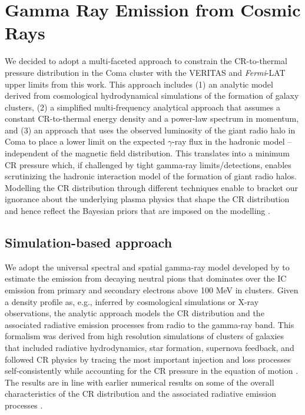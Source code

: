 \documentclass[12pt,manuscript]{aastex}
\begin{document}
\section{Gamma Ray Emission from Cosmic Rays}
We decided to adopt a multi-faceted approach to constrain the CR-to-thermal pressure distribution in the Coma cluster with the VERITAS and \emph{Fermi}-LAT upper limits from this work. This approach includes (1) an analytic model derived from cosmological hydrodynamical simulations of the formation of galaxy clusters, (2) a simplified multi-frequency analytical approach that assumes a constant CR-to-thermal energy density and a power-law spectrum in momentum, and (3) an approach that uses the observed luminosity of the giant radio halo in Coma to place a lower limit on the expected $\gamma$-ray flux in the hadronic model -- independent of the magnetic field distribution. This translates into a minimum CR pressure which, if challenged by tight gamma-ray limits/detections, enables scrutinizing the hadronic interaction model of the formation of giant radio halos. Modelling the CR distribution through different techniques enable to bracket our ignorance about the underlying plasma
physics that shape the CR distribution and hence reflect the Bayesian priors that are imposed on the modelling \citep[see][for a discussion]{article:PinzkePfrommerBergstrom}.

\subsection{Simulation-based approach}
We adopt the universal spectral and spatial gamma-ray model developed by \citet{article:PinzkePfrommer:2010} to estimate the emission from decaying neutral pions that dominates over the IC emission from primary and secondary electrons above 100 MeV in clusters. Given a density profile as, e.g., inferred by cosmological simulations or X-ray observations, the analytic approach models the CR distribution and the associated radiative emission processes from radio to the gamma-ray band. This formalism was derived from high resolution simulations of clusters of galaxies that included radiative hydrodynamics, star formation, supernova feedback, and followed CR physics by tracing the most important injection and loss processes self-consistently while accounting for the CR pressure in the equation of motion \citep{article:PfrommerSpringelEnsslinJubelgas, article:EnsslinPfrommerSpringelJubelgas:2007, article:JubelgasSpringelEnsslinPfrommer:2008}. The results are in line with earlier numerical results on some of the overall characteristics of the CR distribution and the associated radiative emission processes \citep{article:DolagEnsslin, article:MiniatiRyuKangJones:2001, article:Miniati:2003, article:Pfrommer_etal:2007, article:PfrommerEnsslinSpringel:2008, article:Pfrommer:2008}.
 
\end{document}
